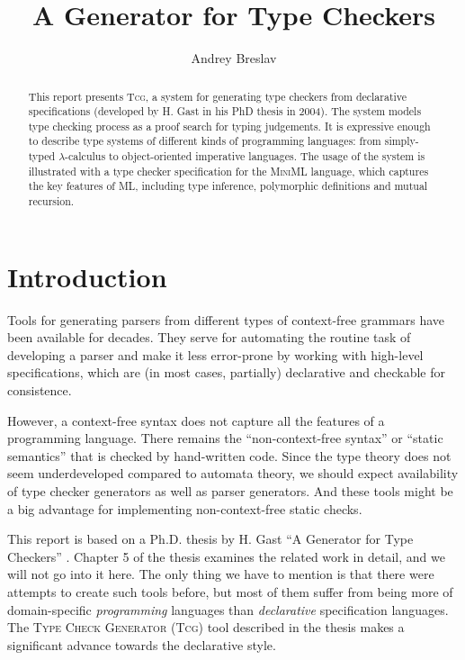 \documentclass[a4paper,12pt]{article}
\title{A Generator for Type Checkers}
\author{Andrey Breslav}
\newcommand{\Tcg}{\textsc{Tcg}}
\begin{document}
\maketitle

\begin{abstract}
	This report presents \Tcg{}, a system for generating type checkers from declarative specifications (developed by H. Gast in his PhD thesis in 2004). The system models type checking process as a proof search for typing judgements. It is expressive enough to describe type systems of different kinds of programming languages: from simply-typed $\lambda$\mbox{-}calculus to object-oriented imperative languages. The usage of the system is illustrated with a type checker specification for the \textsc{MiniML} language, which captures the key features of ML, including type inference, polymorphic definitions and mutual recursion. 
\end{abstract}

\section{Introduction}

Tools for generating parsers from different types of context-free grammars have been available for decades. They serve for automating the routine task of developing a parser and make it less error-prone by working with high-level specifications, which are (in most cases, partially) declarative and checkable for consistence.

However, a context-free syntax does not capture all the features of a programming language. There remains the ``non-context-free syntax'' or ``static semantics'' that is checked by hand-written code. Since the type theory does not seem underdeveloped compared to automata theory, we should expect availability of type checker generators as well as parser generators. And these tools might be a big advantage for implementing non-context-free static checks.

This report is based on a Ph.D. thesis by H. Gast ``A Generator for Type Checkers'' \cite{Tcg}. Chapter 5 of the thesis examines the related work in detail, and we will not go into it here. The only thing we have to mention is that there were attempts to create such tools before, but most of them suffer from being more of domain-specific \emph{programming} languages than \emph{declarative} specification languages. The \textsc{Type Check Generator} (\Tcg{}) tool described in the thesis makes a significant advance towards the declarative style.
\end{document}
